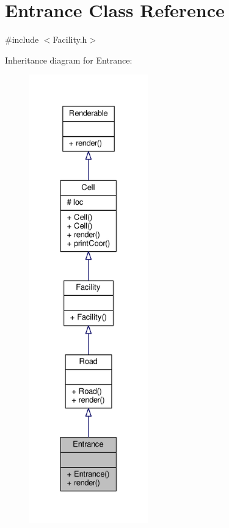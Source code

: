 \hypertarget{classEntrance}{}\section{Entrance Class Reference}
\label{classEntrance}


{\ttfamily \#include $<$Facility.\+h$>$}



Inheritance diagram for Entrance\+:
\nopagebreak
\begin{figure}[H]
\begin{center}
\leavevmode
\includegraphics[height=550pt]{classEntrance__inherit__graph}
\end{center}
\end{figure}


